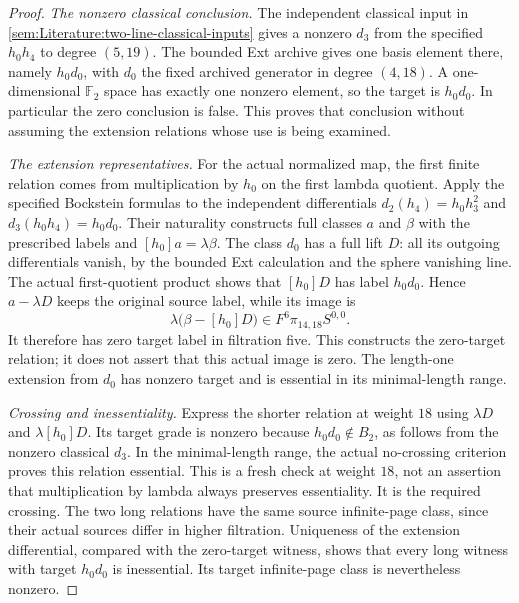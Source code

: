 \begin{proof}
\textit{The nonzero classical conclusion.} The independent classical input in
\ref{sem:Literature:two-line-classical-inputs} gives a nonzero $d_3$ from
the specified $h_0h_4$ to degree $(5,19)$. The bounded Ext archive gives
one basis element there, namely $h_0d_0$, with $d_0$ the fixed archived
generator in degree $(4,18)$. A one-dimensional $\mathbb F_2$ space has
exactly one nonzero element, so the target is $h_0d_0$. In particular the
zero conclusion is false. This proves that conclusion without assuming
the extension relations whose use is being examined.

\textit{The extension representatives.} For the actual normalized
map, the first finite relation comes from multiplication by $h_0$
on the first lambda quotient. Apply the specified Bockstein
formulas to the independent differentials
$d_2(h_4)=h_0h_3^2$ and $d_3(h_0h_4)=h_0d_0$.
Their naturality constructs full classes $a$ and $\beta$ with
the prescribed labels and $[h_0]a=\lambda\beta$.
The class $d_0$ has a full lift $D$: all its outgoing differentials
vanish, by the bounded Ext calculation and the sphere vanishing line.
The actual first-quotient product shows that $[h_0]D$ has label
$h_0d_0$. Hence $a-\lambda D$ keeps the original source label,
while its image is
\[
\lambda\bigl(\beta-[h_0]D\bigr)\in F^6\pi_{14,18}S^{0,0}.
\]
It therefore has zero target label in filtration five. This
constructs the zero-target relation; it does not assert that this
actual image is zero. The length-one extension from $d_0$ has
nonzero target and is essential in its minimal-length range.

\textit{Crossing and inessentiality.} Express the shorter relation
at weight $18$ using $\lambda D$ and $\lambda[h_0]D$.
Its target grade is nonzero because $h_0d_0\notin B_2$, as follows
from the nonzero classical $d_3$. In the minimal-length range,
the actual no-crossing criterion proves this relation essential.
This is a fresh check at weight $18$, not an assertion that
multiplication by lambda always preserves essentiality.
It is the required crossing. The two long relations have the
same source infinite-page class, since their actual sources
differ in higher filtration. Uniqueness of the extension
differential, compared with the zero-target witness, shows that
every long witness with target $h_0d_0$ is inessential.
Its target infinite-page class is nevertheless nonzero.


\end{proof}
